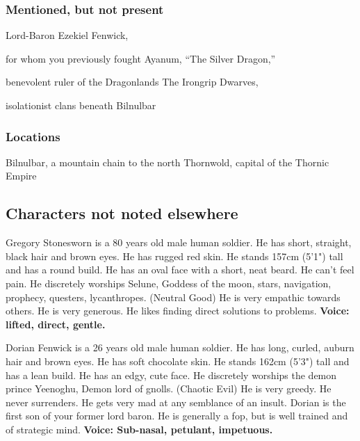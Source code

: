 \begin{multicols}{2}
\subsubsection{Mentioned, but not present}
Lord-Baron Ezekiel Fenwick,\par for whom you previously fought \newline
Ayanum, ``The Silver Dragon,''\par benevolent ruler of the Dragonlands \newline
The Irongrip Dwarves,\par isolationist clans beneath Bilnulbar

\subsubsection{Locations}
Bilnulbar, a mountain chain to the north  \newline
Thornwold, capital of the Thornic Empire
\end{multicols}
\noindent
\hrulefill

\subsection*{Characters not noted elsewhere}

Gregory Stonesworn is a 80 years old male human soldier.
He has short, straight, black hair and brown eyes.
He has rugged red skin.
He stands 157cm (5'1") tall and has a round build.
He has an oval face with a short, neat beard.
He can't feel pain.
He discretely worships Selune, Goddess of the moon, stars, navigation, prophecy, questers, lycanthropes. (Neutral Good)
He is very empathic towards others.
He is very generous.
He likes finding direct solutions to problems.
\textbf{Voice: lifted, direct, gentle.}

Dorian Fenwick is a 26 years old male human soldier.
He has long, curled, auburn hair and brown eyes.
He has soft chocolate skin.
He stands 162cm (5'3") tall and has a lean build.
He has an edgy, cute face.
He discretely worships the demon prince Yeenoghu, Demon lord of gnolls. (Chaotic Evil)
He is very greedy.
He never surrenders.
He gets very mad at any semblance of an insult.
Dorian is the first son of your former lord baron.
He is generally a fop, but is well trained and of strategic mind.
\textbf{Voice: Sub-nasal, petulant, impetuous.}

\hrulefill
\clearpage


